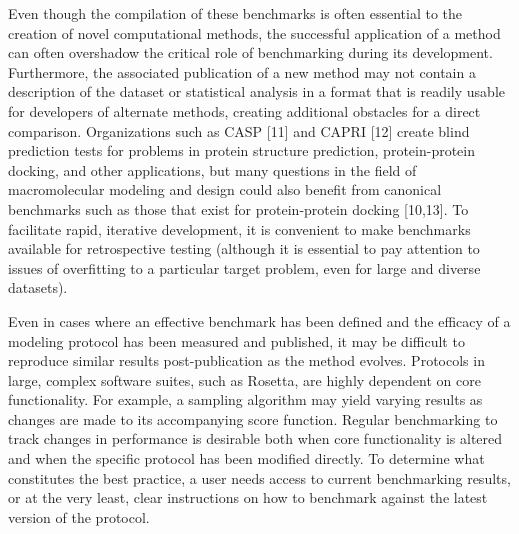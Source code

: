 Even though the compilation of these benchmarks is often essential to the creation of novel computational methods, the successful application of a method can often overshadow the critical role of benchmarking during its development. Furthermore, the associated publication of a new method may not contain a description of the dataset or statistical analysis in a format that is readily usable for developers of alternate methods, creating additional obstacles for a direct comparison. Organizations such as CASP [11] and CAPRI [12] create blind prediction tests for problems in protein structure prediction, protein-protein docking, and other applications, but many questions in the field of macromolecular modeling and design could also benefit from canonical benchmarks such as those that exist for protein-protein docking [10,13]. To facilitate rapid, iterative development, it is convenient to make benchmarks available for retrospective testing (although it is essential to pay attention to issues of overfitting to a particular target problem, even for large and diverse datasets).

Even in cases where an effective benchmark has been defined and the efficacy of a modeling protocol has been measured and published, it may be difficult to reproduce similar results post-publication as the method evolves. Protocols in large, complex software suites, such as Rosetta, are highly dependent on core functionality. For example, a sampling algorithm may yield varying results as changes are made to its accompanying score function. Regular benchmarking to track changes in performance is desirable both when core functionality is altered and when the specific protocol has been modified directly. To determine what constitutes the best practice, a user needs access to current benchmarking results, or at the very least, clear instructions on how to benchmark against the latest version of the protocol.

